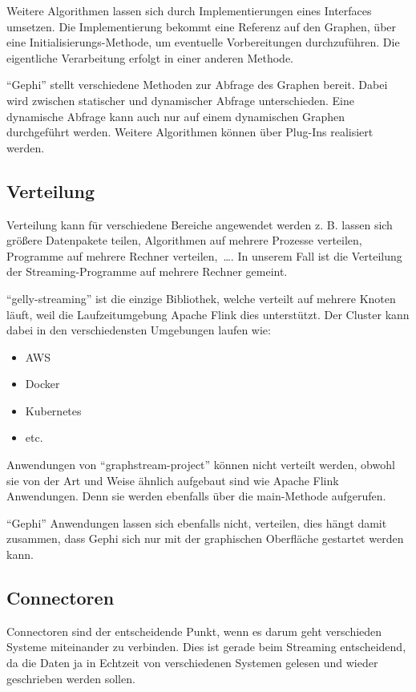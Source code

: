 Weitere Algorithmen lassen sich durch Implementierungen eines Interfaces umsetzen.
Die Implementierung bekommt eine Referenz auf den Graphen, über eine
Initialisierungs-Methode, um eventuelle Vorbereitungen durchzuführen. Die
eigentliche Verarbeitung erfolgt in einer anderen Methode.

\enquote{Gephi} stellt verschiedene Methoden zur Abfrage des Graphen bereit.
Dabei wird zwischen statischer und dynamischer Abfrage unterschieden. Eine
dynamische Abfrage kann auch nur auf einem dynamischen Graphen durchgeführt
werden. Weitere Algorithmen können über Plug-Ins realisiert werden.

\subsection{Verteilung}
Verteilung kann für verschiedene Bereiche angewendet werden z. B. lassen sich
größere Datenpakete teilen, Algorithmen auf mehrere Prozesse verteilen, Programme
auf mehrere Rechner verteilen,~\dots . In unserem Fall ist die Verteilung der
Streaming-Programme auf mehrere Rechner gemeint.

\enquote{gelly-streaming} ist die einzige Bibliothek, welche verteilt auf mehrere
Knoten läuft, weil die Laufzeitumgebung Apache Flink dies unterstützt.
Der Cluster kann dabei in den verschiedensten Umgebungen laufen wie: \cite{Foundation2018}

\begin{itemize}
\item AWS
\item Docker
\item Kubernetes
\item etc.
\end{itemize}

Anwendungen von \enquote{graphstream-project} können nicht verteilt werden,
obwohl sie von der Art und Weise ähnlich aufgebaut sind wie Apache Flink Anwendungen.
Denn sie werden ebenfalls über die main-Methode aufgerufen.

\enquote{Gephi} Anwendungen lassen sich ebenfalls nicht, verteilen, dies hängt
damit zusammen, dass Gephi sich nur mit der graphischen Oberfläche gestartet
werden kann.

\subsection{Connectoren}
Connectoren sind der entscheidende Punkt, wenn es darum geht verschieden Systeme
miteinander zu verbinden. Dies ist gerade beim Streaming entscheidend, da die
Daten ja in Echtzeit von verschiedenen Systemen gelesen und wieder geschrieben
werden sollen.

